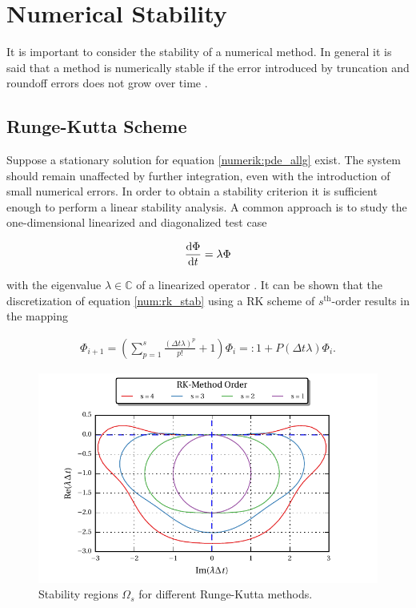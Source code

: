 \section{Numerical Stability}

It is important to consider the stability of a numerical method. In general it is said that a method is numerically stable if the error
introduced by truncation and roundoff errors does not grow over time \citep{ferziger99}.\\

\subsection{Runge-Kutta Scheme}

Suppose  a stationary solution for equation \ref{numerik:pde_allg} exist.
The system should remain unaffected by further integration, even with the introduction of small numerical errors.
In order to obtain a stability criterion it is sufficient enough to perform a linear stability analysis.
A common approach is to study the one-dimensional linearized and diagonalized test case

\begin{align}
\label{num:rk_stab}
\frac{\mathop{}\!\mathrm{d} \Phi}{\mathop{}\!\mathrm{d} t} = \lambda \Phi
\end{align}

with the eigenvalue $\lambda \in \mathbb{C}$ of a linearized operator \citep{Williamson1980}.
It can be shown that the discretization of equation \ref{num:rk_stab} using a RK scheme of $s^{\text{th}}$-order
results in  the mapping \citep{Williamson1980}

\begin{align}
    \Phi_{i+1}  = \left(\sum_{p=1}^s \frac{(\Delta t \lambda)^p}{p!}  + 1 \right) \Phi_i =: 1 + P(\Delta t\lambda)\Phi_i.
\end{align}

\begin{figure}[!tp]
  \begin{minipage}[c]{0.6\textwidth}
      \includegraphics{gfx/numerik/rk_stability.pdf}
  \end{minipage}\hfill
  \begin{minipage}[c]{0.3\textwidth}
  \caption{Stability regions $\Omega_s$ for different Runge-Kutta methods.}
  \label{fig:num_rkstab}
  \end{minipage}
\end{figure}

